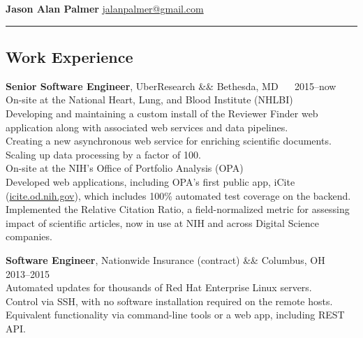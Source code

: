 \documentclass[12pt]{report}
\makeatletter
\renewcommand{\bullet}{$\vcenter{\hbox{~\huge$\cdot$~}}$}
\newenvironment{jobhead}
{\tabularx{\textwidth}{ @{} l X r @{} }}
{\endtabularx}
\newenvironment{bullets}
{\tabularx{\textwidth}{ @{\bullet} X @{} }}
{\endtabularx}
\makeatother
\begin{document}
\textbf{\large Jason Alan Palmer} \hfill \href{mailto:jalanpalmer@gmail.com}{jalanpalmer@gmail.com}

\rule{\textwidth}{1pt}

\subsection*{Work Experience}

\begin{jobhead}
\textbf{Senior Software Engineer}, UberResearch && Bethesda, MD ~~ 2015--now \\
\end{jobhead}
On-site at the National Heart, Lung, and Blood Institute (NHLBI) \\
\begin{bullets}
Developing and maintaining a custom install of the Reviewer Finder web application along with associated web services and data pipelines. \\
Creating a new asynchronous web service for enriching scientific documents. \\
Scaling up data processing by a factor of 100. \\
\end{bullets}
On-site at the NIH's Office of Portfolio Analysis (OPA) \\
\begin{bullets}
Developed web applications, including OPA's first public app, iCite (\href{https://icite.od.nih.gov}{icite.od.nih.gov}), which includes 100\% automated test coverage on the backend. \\
Implemented the Relative Citation Ratio, a field-normalized metric for assessing impact of scientific articles, now in use at NIH and across Digital Science companies. \\
\end{bullets}

\begin{jobhead}
\textbf{Software Engineer}, Nationwide Insurance (contract) && Columbus, OH ~~ 2013--2015 \\
\end{jobhead}
\begin{bullets}
Automated updates for thousands of Red Hat Enterprise Linux servers. \\
Control via SSH, with no software installation required on the remote hosts. \\
Equivalent functionality via command-line tools or a web app, including REST API. \\
\end{bullets}
\end{document}
